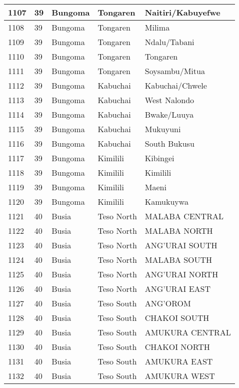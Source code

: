 \begin{table}[!ht]
\begin{tabular}{|l|l|l|l|l|}
        1107 & 39 & Bungoma & Tongaren & Naitiri/Kabuyefwe \\ \hline
        1108 & 39 & Bungoma & Tongaren & Milima \\ \hline
        1109 & 39 & Bungoma & Tongaren & Ndalu/Tabani \\ \hline
        1110 & 39 & Bungoma & Tongaren & Tongaren \\ \hline
        1111 & 39 & Bungoma & Tongaren & Soysambu/Mitua \\ \hline
        1112 & 39 & Bungoma & Kabuchai & Kabuchai/Chwele \\ \hline
        1113 & 39 & Bungoma & Kabuchai & West Nalondo \\ \hline
        1114 & 39 & Bungoma & Kabuchai & Bwake/Luuya \\ \hline
        1115 & 39 & Bungoma & Kabuchai & Mukuyuni \\ \hline
        1116 & 39 & Bungoma & Kabuchai & South Bukusu \\ \hline
        1117 & 39 & Bungoma & Kimilili & Kibingei \\ \hline
        1118 & 39 & Bungoma & Kimilili & Kimilili \\ \hline
        1119 & 39 & Bungoma & Kimilili & Maeni \\ \hline
        1120 & 39 & Bungoma & Kimilili & Kamukuywa \\ \hline
        1121 & 40 & Busia & Teso North & MALABA CENTRAL \\ \hline
        1122 & 40 & Busia & Teso North & MALABA NORTH \\ \hline
        1123 & 40 & Busia & Teso North & ANG’URAI SOUTH \\ \hline
        1124 & 40 & Busia & Teso North & MALABA SOUTH \\ \hline
        1125 & 40 & Busia & Teso North & ANG’URAI NORTH \\ \hline
        1126 & 40 & Busia & Teso North & ANG’URAI EAST \\ \hline
        1127 & 40 & Busia & Teso South & ANG’OROM \\ \hline
        1128 & 40 & Busia & Teso South & CHAKOI SOUTH \\ \hline
        1129 & 40 & Busia & Teso South & AMUKURA CENTRAL \\ \hline
        1130 & 40 & Busia & Teso South & CHAKOI NORTH \\ \hline
        1131 & 40 & Busia & Teso South & AMUKURA EAST \\ \hline
        1132 & 40 & Busia & Teso South & AMUKURA WEST \\ \hline

\end{tabular}
\end{table}
